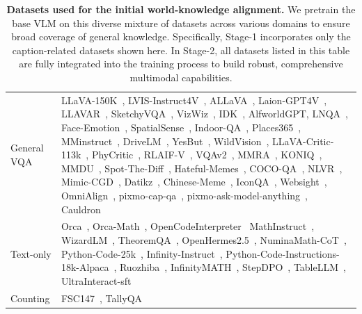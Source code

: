 \documentclass{llmxive}
\begin{document}
\begin{table}[!tbp]
{\begin{tabular}{m{1.6cm}|>{\small}m{15.4cm}}
\rowcolor{gray!15}\footnotesize 
General VQA & LLaVA-150K~\cite{liu2023llava}, LVIS-Instruct4V~\cite{wang2023lvisinstruct4v}, ALLaVA~\cite{chen2024allava},  Laion-GPT4V~\cite{laion_gpt4v_dataset}, LLAVAR~\cite{zhang2023llavar}, SketchyVQA~\cite{tu2023many}, VizWiz~\cite{gurari2018vizwiz}, IDK~\cite{cha2024visually}, AlfworldGPT, LNQA~\cite{pont2020connecting_lnqa}, Face-Emotion~\cite{fastjob_visual_emotional_analysis}, SpatialSense~\cite{yang2019spatialsense}, Indoor-QA~\cite{keremberke_indoor_scene_classification}, Places365~\cite{zhou2017places365}, MMinstruct~\cite{liu2024mminstruct}, DriveLM~\cite{sima2023drivelm}, YesBut~\cite{nandy2024yesbut}, WildVision~\cite{lu2024wildvision}, LLaVA-Critic-113k~\cite{xiong2024llava_critic}, PhyCritic~\cite{xiong2026phycritic}, RLAIF-V~\cite{yu2024rlaif_v}, VQAv2~\cite{goyal2017vqav2}, MMRA~\cite{wu2024mmra}, KONIQ~\cite{hosu2020koniq}, MMDU~\cite{liu2024mmdu}, Spot-The-Diff~\cite{jhamtani2018learning_spotthediff}, Hateful-Memes~\cite{kiela2020hateful_memes}, COCO-QA~\cite{ren2015exploring_cocoqa}, NLVR~\cite{suhr2017corpus_nlvr2}, Mimic-CGD~\cite{laurenccon2024matters}, Datikz~\cite{belouadi2023automatikz_datikz},
Chinese-Meme~\cite{emo_visual_data_chinese_meme}, IconQA~\cite{lu2021iconqa}, Websight~\cite{laurenccon2024unlocking_websight}, OmniAlign~\cite{zhao2025omnialign}, pixmo-cap-qa~\cite{deitke2025molmo}, pixmo-ask-model-anything~\cite{deitke2025molmo}, Cauldron~\cite{laurenccon2024matters} \\

\footnotesize 
Text-only & Orca~\cite{lian2023openorca}, Orca-Math~\cite{mitra2024orca}, OpenCodeInterpreter~\cite{zheng2024opencodeinterpreter}
MathInstruct~\cite{yue2023mammoth_mathinstruct}, WizardLM~\cite{xu2023wizardlm}, TheoremQA~\cite{chen2023theoremqa}, OpenHermes2.5~\cite{OpenHermes2_5}, NuminaMath-CoT~\cite{numina_math_datasets}, Python-Code-25k~\cite{flytech_python_codes_25k}, Infinity-Instruct~\cite{baai_infinity_instruct},
Python-Code-Instructions-18k-Alpaca~\cite{iamtarun_python_code_instructions_18k_alpaca}, Ruozhiba~\cite{looksjuicy_ruozhiba}, InfinityMATH~\cite{zhang2024infinitymath}, StepDPO~\cite{lai2024stepDPO}, TableLLM~\cite{zhang2024tablellm}, UltraInteract-sft~\cite{yuan2024advancing_ultrainteract}\\

\rowcolor{gray!15}\footnotesize 
Counting & FSC147~\cite{m_Ranjan-etal-CVPR21}, TallyQA~\cite{acharya2019tallyqa} \\
\end{tabular}}
\label{tab:data_sft}
\caption{\textbf{Datasets used for the initial world-knowledge alignment.} We pretrain the base VLM on this diverse mixture of datasets across various domains to ensure broad coverage of general knowledge. Specifically, Stage-1 incorporates only the caption-related datasets shown here. In Stage-2, all datasets listed in this table are fully integrated into the training process to build robust, comprehensive multimodal capabilities.}
\end{table}
\end{document}

